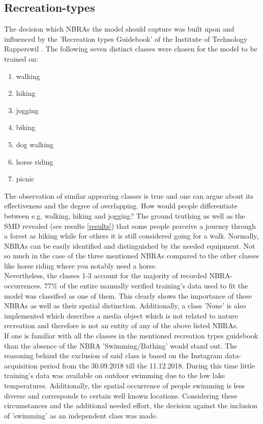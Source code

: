 \clearpage

\subsection{Recreation-types} \label{recreation_types}
The decision which NBRAs the model should capture was built upon and influenced by the 'Recreation types Guidebook' of the Institute of Technology Rapperswil \parencite{IFL2018}. The following seven distinct classes were chosen for the model to be trained on:
\begin{enumerate}
    \item walking
    \item hiking
    \item jogging
    \item biking
    \item dog walking
    \item horse riding
    \item picnic
\end{enumerate}
The observation of similar appearing classes is true and one can argue about its effectiveness and the degree of overlapping. How would people differentiate between e.g. walking, hiking and jogging? The ground truthing as well as the SMD revealed (see results \ref{results}) that some people perceive a journey through a forest as hiking while for others it is still considered going for a walk. Normally, NBRAs can be easily identified and distinguished by the needed equipment. Not so much in the case of the three mentioned NBRAs compared to the other classes like horse riding where you notably need a horse.\\
Nevertheless, the classes 1-3 account for the majority of recorded NBRA-occurrences. 77\% of the entire manually verified training's data used to fit the model was classified as one of them. This clearly shows the importance of these NBRAs as well as their spatial distinction.
Additionally, a class 'None' is also implemented which describes a media object which is not related to nature recreation and therefore is not an entity of any of the above listed NBRAs.\\
\newline
If one is familiar with all the classes in the mentioned recreation types guidebook \parencite{IFL2018} than the absence of the NBRA 'Swimming/Bathing' would stand out. The reasoning behind the exclusion of said class is based on the Instagram data-acquisition period from the 30.09.2018 till the 11.12.2018. During this time little training's data was available on outdoor swimming due to the low lake temperatures. Additionally, the spatial occurrence of people swimming is less diverse and corresponds to certain well known locations. Considering these circumstances and the additional needed effort, the decision against the inclusion of 'swimming' as an independent class was made.

